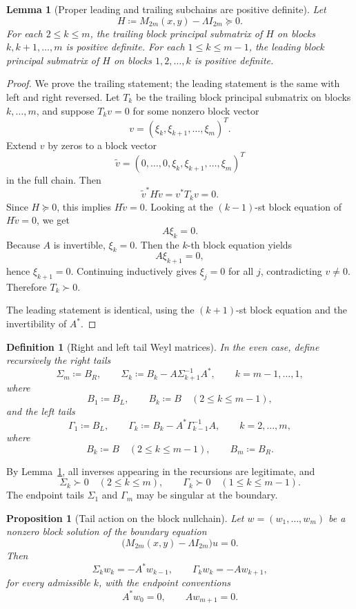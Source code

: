 \documentclass[11pt]{article}
\newtheorem{lemma}[theorem]{Lemma}
\newtheorem{proposition}[theorem]{Proposition}
\newtheorem{definition}[theorem]{Definition}
\begin{document}
\begin{lemma}[Proper leading and trailing subchains are positive definite]\label{lem:proper}
Let
\[
H\coloneqq M_{2m}(x,y)-\Lambda I_{2m}\succeq 0.
\]
For each \(2\le k\le m\), the trailing block principal submatrix of \(H\) on blocks
\(k,k+1,\dots,m\) is positive definite. For each \(1\le k\le m-1\), the leading block principal
submatrix of \(H\) on blocks \(1,2,\dots,k\) is positive definite.
\end{lemma}

\begin{proof}
We prove the trailing statement; the leading statement is the same with left and right reversed.
Let \(T_k\) be the trailing block principal submatrix on blocks \(k,\dots,m\), and suppose
\(T_k v=0\) for some nonzero block vector
\[
v=(\xi_k,\xi_{k+1},\dots,\xi_m)^T.
\]
Extend \(v\) by zeros to a block vector
\[
\widetilde v=(0,\dots,0,\xi_k,\xi_{k+1},\dots,\xi_m)^T
\]
in the full chain. Then
\[
\widetilde v^* H \widetilde v=v^*T_k v=0.
\]
Since \(H\succeq 0\), this implies \(H\widetilde v=0\). Looking at the \((k-1)\)-st block
equation of \(H\widetilde v=0\), we get
\[
A\xi_k=0.
\]
Because \(A\) is invertible, \(\xi_k=0\). Then the \(k\)-th block equation yields
\[
A\xi_{k+1}=0,
\]
hence \(\xi_{k+1}=0\). Continuing inductively gives \(\xi_j=0\) for all \(j\), contradicting
\(v\neq 0\). Therefore \(T_k\succ 0\).

The leading statement is identical, using the \((k+1)\)-st block equation and the invertibility
of \(A^*\).
\end{proof}

\begin{definition}[Right and left tail Weyl matrices]
In the even case, define recursively the right tails
\[
\Sigma_m\coloneqq B_R,
\qquad
\Sigma_k\coloneqq B_k-A\Sigma_{k+1}^{-1}A^*,
\qquad
k=m-1,\dots,1,
\]
where
\[
B_1\coloneqq B_L,
\qquad
B_k\coloneqq B
\quad (2\le k\le m-1),
\]
and the left tails
\[
\Gamma_1\coloneqq B_L,
\qquad
\Gamma_k\coloneqq B_k-A^*\Gamma_{k-1}^{-1}A,
\qquad
k=2,\dots,m,
\]
where
\[
B_k\coloneqq B
\quad (2\le k\le m-1),
\qquad
B_m\coloneqq B_R.
\]
\end{definition}

By Lemma~\ref{lem:proper}, all inverses appearing in the recursions are legitimate, and
\[
\Sigma_k\succ 0 \quad (2\le k\le m),
\qquad
\Gamma_k\succ 0 \quad (1\le k\le m-1).
\]
The endpoint tails \(\Sigma_1\) and \(\Gamma_m\) may be singular at the boundary.

\begin{proposition}[Tail action on the block nullchain]\label{prop:tails}
Let \(w=(w_1,\dots,w_m)\) be a nonzero block solution of the boundary equation
\[
\bigl(M_{2m}(x,y)-\Lambda I_{2m}\bigr)u=0.
\]
Then
\[
\Sigma_k w_k=-A^*w_{k-1},
\qquad
\Gamma_k w_k=-Aw_{k+1},
\]
for every admissible \(k\), with the endpoint conventions
\[
A^*w_0=0,
\qquad
Aw_{m+1}=0.
\]
\end{proposition}
\end{document}
